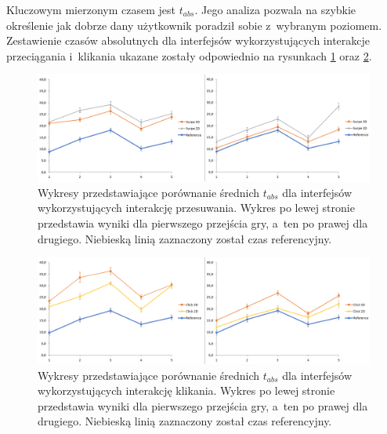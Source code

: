 \documentclass[a4paper,12pt,numbers=noenddot]{report}
\begin{document}
Kluczowym mierzonym czasem jest $t_{abs}$. Jego analiza pozwala na szybkie określenie jak dobrze dany użytkownik poradził sobie z~wybranym poziomem. Zestawienie czasów absolutnych dla interfejsów wykorzystujących interakcje przeciągania i~klikania ukazane zostały odpowiednio na rysunkach \ref{fig:diag:tAbs_Swipe12} oraz \ref{fig:diag:tAbs_Click12}.

\begin{figure}[h!]
	\centering
  	\includegraphics[width=\linewidth]{diag/tAbs_Swipe12.png}
	\caption{Wykresy przedstawiające porównanie średnich $t_{abs}$ dla interfejsów wykorzystujących interakcję przesuwania. Wykres po lewej stronie przedstawia wyniki dla pierwszego przejścia gry, a~ten po prawej dla drugiego. Niebieską linią zaznaczony został czas referencyjny.}
	\label{fig:diag:tAbs_Swipe12}
\end{figure}

\begin{figure}[h!]
	\centering
  	\includegraphics[width=\linewidth]{diag/tAbs_Click12.png}
	\caption{Wykresy przedstawiające porównanie średnich $t_{abs}$ dla interfejsów wykorzystujących interakcję klikania. Wykres po lewej stronie przedstawia wyniki dla pierwszego przejścia gry, a~ten po prawej dla drugiego. Niebieską linią zaznaczony został czas referencyjny.}
	\label{fig:diag:tAbs_Click12}
\end{figure}
\end{document}
